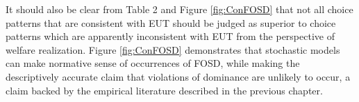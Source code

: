 \documentclass[../main.tex]{subfiles}
\begin{document}
It should also be clear from Table 2 and Figure \ref{fig:ConFOSD} that not all choice patterns that are consistent with EUT should be judged as superior to choice patterns which are apparently inconsistent with EUT from the perspective of welfare realization.
Figure \ref{fig:ConFOSD} demonstrates that stochastic models can make normative sense of occurrences of FOSD, while making the descriptively accurate claim that violations of dominance are unlikely to occur, a claim backed by the empirical literature described in the previous chapter.

%
%
\end{document}
